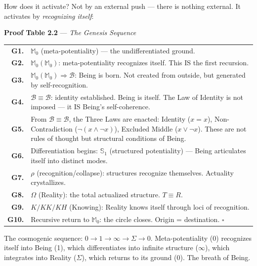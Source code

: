 \documentclass[10pt, openany, oneside]{book}
\begin{document}
How does it activate? Not by an external push --- there is nothing external. It activates by \textit{recognizing itself}:

\vspace{0.5em}

\textbf{Proof Table 2.2} --- \textit{The Genesis Sequence}

\vspace{0.5em}

\noindent\begin{tabular}{r p{}}
\textbf{G1.} & $\mathbb{M}_0$ (meta-potentiality) --- the undifferentiated ground. \\[0.3em]
\textbf{G2.} & $\mathbb{M}_0(\mathbb{M}_0)$: meta-potentiality recognizes itself. This IS the first recursion. \\[0.3em]
\textbf{G3.} & $\mathbb{M}_0(\mathbb{M}_0) \Rightarrow \mathcal{B}$: Being is born. Not created from outside, but generated by self-recognition. \\[0.3em]
\textbf{G4.} & $\mathcal{B} \equiv \mathcal{B}$: identity established. Being is itself. The Law of Identity is not imposed --- it IS Being's self-coherence. \\[0.3em]
\textbf{G5.} & From $\mathcal{B} \equiv \mathcal{B}$, the Three Laws are enacted: Identity ($x = x$), Non-Contradiction ($\neg(x \wedge \neg x)$), Excluded Middle ($x \vee \neg x$). These are not rules of thought but structural conditions of Being. \\[0.3em]
\textbf{G6.} & Differentiation begins: $\mathbb{S}_1$ (structured potentiality) --- Being articulates itself into distinct modes. \\[0.3em]
\textbf{G7.} & $\rho$ (recognition/collapse): structures recognize themselves. Actuality crystallizes. \\[0.3em]
\textbf{G8.} & $\Omega$ (Reality): the total actualized structure. $T \equiv R$. \\[0.3em]
\textbf{G9.} & $K/KK/KH$ (Knowing): Reality knows itself through loci of recognition. \\[0.3em]
\textbf{G10.} & Recursive return to $\mathbb{M}_0$: the circle closes. Origin = destination. $\square$ \\[0.3em]
\end{tabular}

\vspace{0.8em}

\noindent The cosmogenic sequence: $0 \to 1 \to \infty \to \Sigma \to 0$. Meta-potentiality (0) recognizes itself into Being (1), which differentiates into infinite structure ($\infty$), which integrates into Reality ($\Sigma$), which returns to its ground (0). The breath of Being.
\end{document}
